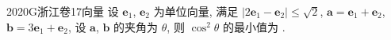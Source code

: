 
\begin{problem}{2020}{G}{浙江卷}{17}{向量}
设 $ \boldsymbol{e}_1 $, $ \boldsymbol{e}_2 $ 为单位向量, 满足 $ |2\boldsymbol{e}_1-\boldsymbol{e}_2|\leq\sqrt{2} $, $ \boldsymbol{a}=\boldsymbol{e}_1+\boldsymbol{e}_2 $, $ \boldsymbol{b}=3\boldsymbol{e}_1+\boldsymbol{e}_2 $, 设 $ \boldsymbol{a} $, $ \boldsymbol{b} $ 的夹角为 $ \theta $, 则 $ \cos^2\theta $ 的最小值为 \underline{\hspace{4em}}.
\end{problem}

\begin{answer}

\end{answer}

\begin{solutions}

\end{solutions}